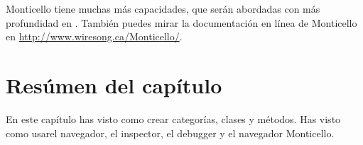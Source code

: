 \documentclass[a4paper,10pt,twoside]{book}
\begin{document}

Monticello tiene muchas m\'as capacidades, que ser\'an abordadas con m\'as profundidad en .
Tambi\'en puedes mirar la documentaci\'on en l\'inea de Monticello en \url{http://www.wiresong.ca/Monticello/}.

\section{Res\'umen del cap\'itulo}
En este cap\'itulo has visto como crear categor\'ias, clases y m\'etodos. Has visto como usarel navegador, el inspector, el debugger y el navegador Monticello.
\end{document}
